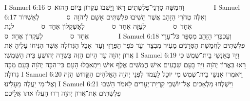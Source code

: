 I Samuel 6:16	וַחֲמִשָּׁה סַרְנֵי־פְלִשְׁתִּים רָאוּ וַיָּשֻׁבוּ עֶקְרוֹן בַּיּוֹם הַהוּא׃ {ס}        
I Samuel 6:17	וְאֵלֶּה טְחֹרֵי הַזָּהָב אֲשֶׁר הֵשִׁיבוּ פְלִשְׁתִּים אָשָׁם לַיהֹוָה {ס}        לְאַשְׁדּוֹד אֶחָד {ס}        לְעַזָּה אֶחָד {ס}        לְאַשְׁקְלוֹן אֶחָד {ס}        לְגַת אֶחָד {ס}        לְעֶקְרוֹן אֶחָד׃ {ס}        
I Samuel 6:18	וְעַכְבְּרֵי הַזָּהָב מִסְפַּר כּל־עָרֵי פְלִשְׁתִּים לַחֲמֵשֶׁת הַסְּרָנִים מֵעִיר מִבְצָר וְעַד כֹּפֶר הַפְּרָזִי וְעַד  אָבֵל הַגְּדוֹלָה אֲשֶׁר הִנִּיחוּ עָלֶיהָ אֵת אֲרוֹן יְהֹוָה עַד הַיּוֹם הַזֶּה בִּשְׂדֵה יְהוֹשֻׁעַ בֵּית הַשִּׁמְשִׁי׃
I Samuel 6:19	וַיַּךְ בְּאַנְשֵׁי בֵית־שֶׁמֶשׁ כִּי רָאוּ בַּאֲרוֹן יְהֹוָה וַיַּךְ בָּעָם שִׁבְעִים אִישׁ חֲמִשִּׁים אֶלֶף אִישׁ וַיִּתְאַבְּלוּ הָעָם כִּי־הִכָּה יְהֹוָה בָּעָם מַכָּה גְדוֹלָה׃
I Samuel 6:20	וַיֹּאמְרוּ אַנְשֵׁי בֵית־שֶׁמֶשׁ מִי יוּכַל לַעֲמֹד לִפְנֵי יְהֹוָה הָאֱלֹהִים הַקָּדוֹשׁ הַזֶּה וְאֶל־מִי יַעֲלֶה מֵעָלֵינוּ׃
I Samuel 6:21	וַיִּשְׁלְחוּ מַלְאָכִים אֶל־יוֹשְׁבֵי קִרְיַת־יְעָרִים לֵאמֹר הֵשִׁבוּ פְלִשְׁתִּים אֶת־אֲרוֹן יְהֹוָה רְדוּ הַעֲלוּ אֹתוֹ אֲלֵיכֶם׃
